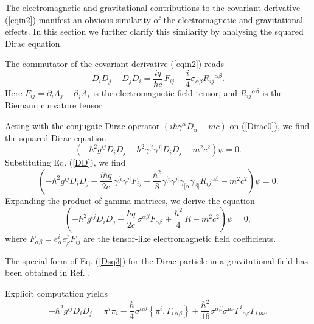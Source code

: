\documentclass[preprint,showpacs,preprintnumbers,eqsecnum,amsmath,amssymb]{revtex4}
\begin{document}
The electromagnetic and gravitational contributions to the
covariant derivative (\ref{eqin2}) manifest an obvious similarity
of the electromagnetic and gravitational effects. In this section
we further clarify this similarity by analysing the squared Dirac equation.

The commutator of the covariant derivative (\ref{eqin2}) reads
\begin{equation}
D_iD_j - D_jD_i = {\frac {iq}{\hbar c}}\,F_{ij} + {\frac
i4}\sigma_{\alpha\beta} R_{ij}{}^{\alpha\beta}.\label{DD}
\end{equation}
Here $F_{ij} = \partial_iA_j - \partial_jA_i$ is the electromagnetic field 
tensor, and $R_{ij}{}^{\alpha\beta}$ is the Riemann curvature tensor.

Acting with the conjugate Dirac operator $\left(i\hbar
\gamma^\alpha D_\alpha + mc\right)$ on (\ref{Dirac0}), we find the
squared Dirac equation
\begin{equation}
\left(- \hbar^2g^{ij}D_iD_j - \hbar^2\gamma^{[i}\gamma^{j]}D_iD_j
- m^2c^2\right) \psi = 0.\label{Dsq1}
\end{equation}
Substituting Eq. (\ref{DD}), we find
\begin{equation}
\left(- \hbar^2g^{ij}D_iD_j - {\frac {i\hbar q}{2c}}\,\gamma^{[i}\gamma^{j]}
F_{ij} + {\frac {\hbar^2}8}\gamma^{[i}\gamma^{j]}\gamma_{[\alpha}\gamma_{\beta]}
R_{ij}{}^{\alpha\beta} - m^2c^2\right)\psi = 0.\label{Dsq2}
\end{equation}
Expanding the product of gamma matrices, we derive the equation
\begin{equation}
\left(-\hbar^2g^{ij}D_iD_j - {\frac {\hbar q}{2c}}\,\sigma^{\alpha\beta}
F_{\alpha\beta} + {\frac {\hbar^2}4}\,R - m^2c^2\right)\psi = 0,\label{Dsq3}
\end{equation}
where $F_{\alpha\beta}=e_\alpha^i e_\beta^jF_{ij}$ are the
tensor-like electromagnetic field coefficients.

The special form of Eq. (\ref{Dsq3}) for the Dirac particle in a
gravitational field has been obtained in Ref. \cite{Christensenduff}.

Explicit computation yields
\begin{equation}\label{D2}
-\hbar^2g^{ij}D_iD_j = \pi^{i}\pi_{i} - \frac {\hbar}{4}\sigma^{\alpha\beta}
\left\{\pi^{i},\Gamma_{i\,\alpha\beta}\right\}+ \frac{\hbar^2}{16}
\sigma^{\alpha\beta}\sigma^{\mu\nu}\Gamma^i{}_{\alpha\beta}\Gamma_{i\,\mu\nu}.
\end{equation}
\end{document}
